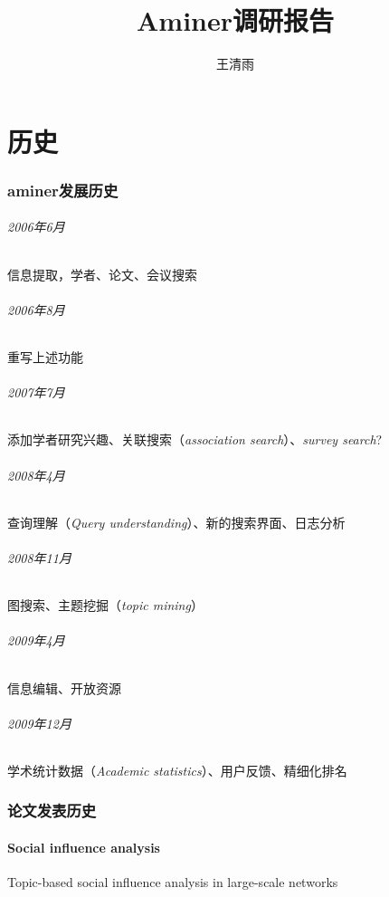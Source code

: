 \documentclass[UTF8]{ctexart}
\title{Aminer调研报告}
\author{王清雨}
\begin{document}
\maketitle
\newpage
\part{历史}
\section{aminer发展历史}

\paragraph{2006年6月}
信息提取，学者、论文、会议搜索
\paragraph{2006年8月}
重写上述功能
\paragraph{2007年7月}
添加学者研究兴趣、关联搜索（\emph{association search}）、\emph{survey search}?
\paragraph{2008年4月}
查询理解（\emph{Query understanding}）、新的搜索界面、日志分析
\paragraph{2008年11月}
图搜索、主题挖掘（\emph{topic mining}）
\paragraph{2009年4月}
信息编辑、开放资源
\paragraph{2009年12月}
学术统计数据（\emph{Academic statistics}）、用户反馈、精细化排名

\section{论文发表历史}

\subsection{Social influence analysis}
Topic-based social influence analysis in large-scale networks
\end{document}
